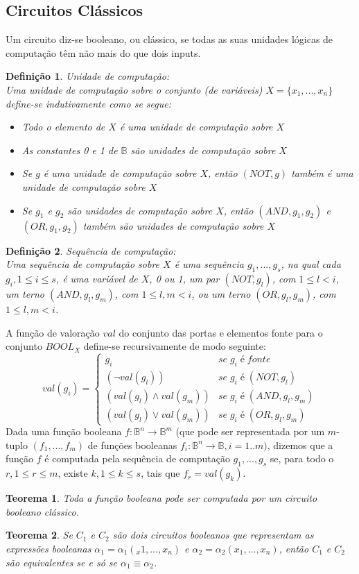 \documentclass[10pt,a4paper]{report}
\newtheorem{definition}{Definição}
\newtheorem{theorem}{Teorema}
\begin{document}
\subsection{Circuitos Clássicos}
Um circuito diz-se booleano, ou clássico, se todas as suas unidades lógicas de computação têm não mais do que dois inputs.
\begin{definition} Unidade de computação:\\
Uma unidade de computação sobre o conjunto (de variáveis) $X = \{x_1, . . . , x_n\}$ define-se indutivamente como se segue:
\begin{itemize}
\item Todo o elemento de $X$ é uma unidade de computação sobre $X$
\item As constantes 0 e 1 de $\mathbb{B}$ são unidades de computação sobre $X$
\item Se $g$ é uma unidade de computação sobre $X$, então $(NOT, g)$ também é uma unidade de computação sobre $X$
\item Se $g_1$ e $g_2$ são unidades de computação sobre $X$, então $(AND, g_1, g_2)$ e $(OR, g_1, g_2)$ também são unidades de computação sobre $X$
\end{itemize}
\end{definition}
\begin{definition} Sequência de computação:\\
Uma sequência de computação sobre $X$ é uma sequência $g_1, ..., g_s$, na qual cada $g_i, 1 \leq i \leq s$, é uma variável de $X$, 0 ou 1, um par $(NOT, g_l)$, com $1 \leq l < i$, um terno $(AND, g_l, g_m)$, com $1 \leq l, m < i$, ou um terno $(OR, g_l, g_m)$, com $1 \leq l, m < i$.
\end{definition}
A função de valoração $val$ do conjunto das portas e elementos fonte para o conjunto $BOOL_X$ define-se recursivamente de modo seguinte:
\[ 
val(g_i) = \left\{
\begin{array}{ll}
      g_i &se \; g_i \; é \; fonte \\
      (\lnot val (g_l)) &se \; g_i \; é \; (NOT,g_l)\\
      (val(g_l) \land val(g_m)) &se \; g_i \; é \; (AND,g_l,g_m)\\
      (val(g_l) \lor val(g_m)) &se \; g_i \; é \; (OR,g_l,g_m)
\end{array} 
\right. 
\]
Dada uma função booleana $f : \mathbb{B}^n \rightarrow \mathbb{B}^m$ (que pode ser representada por um $m$-tuplo $(f_1, . . . , f_m)$ de funções booleanas $f_i : \mathbb{B}^n \rightarrow \mathbb{B}, i = 1..m)$, dizemos que a função $f$ é computada pela sequência de computação $g_1, . . . , g_s$ se, para todo o $r, 1 \leq r \leq m$, existe $k, 1 \leq k \leq s$, tais que $f_r = val(g_k)$.
\begin{theorem}
Toda a função booleana pode ser computada por um circuito booleano clássico.
\end{theorem}
\begin{theorem}
Se $C_1$ e $C_2$ são dois circuitos booleanos que representam as expressões booleanas $\alpha_1 = \alpha_1(_x1, ..., x_n)$ e $\alpha_2 = \alpha_2(x_1, ..., x_n)$, então $C_1$ e $C_2$ são equivalentes se e só se $\alpha_1 \equiv \alpha_2$.
\end{theorem}
\end{document}
